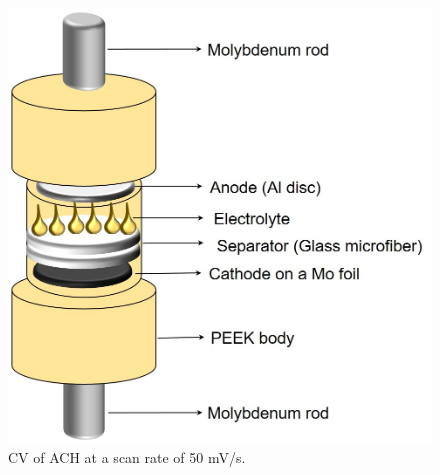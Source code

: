 \begin{figure}[tbh!]
  \centering
  \includegraphics[width=\textwidth]{SF/PEEK}
    \caption{CV of ACH at a scan rate of 50 mV/s.}
  \label{SF:PEEK}
\end{figure}
